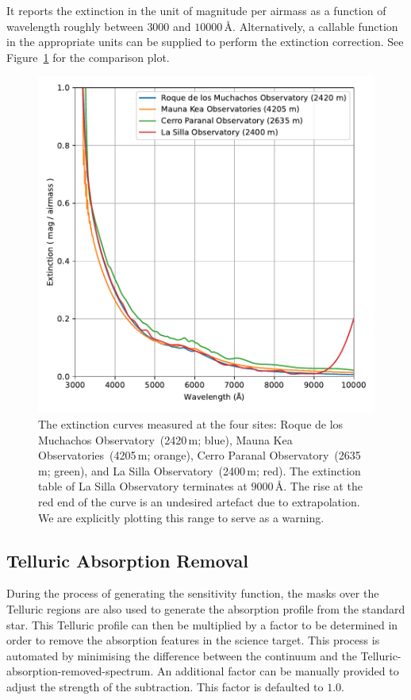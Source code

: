 \documentclass[fleqn,usenatbib]{mnras}
\begin{document}
It reports the extinction in the unit of magnitude per airmass as a
function of wavelength roughly between $3000$ and $10000$\,\AA.
Alternatively, a callable function in the appropriate units can be
supplied to perform the extinction correction. See Figure~\ref{fig:extinction}
for the comparison plot.

\begin{figure}
    \centering
    \includegraphics[width=\columnwidth]{fig_07_extinction_curves.pdf}
    \caption{The extinction curves measured at the four sites: Roque de los Muchachos
    Observatory~(2420\,m; blue), Mauna Kea Observatories~(4205\,m; orange),
    Cerro Paranal Observatory~(2635\,m; green), and La Silla Observatory~(2400\,m; red).
    The extinction table of La Silla Observatory terminates at $9000$\,\AA. The rise at
    the red end of the curve is an undesired artefact due to extrapolation. We are
    explicitly plotting this range to serve as a warning.}
    \label{fig:extinction}
\end{figure}

\subsection{Telluric Absorption Removal}
During the process of generating the sensitivity function, the masks
over the Telluric regions are also used to generate the absorption profile
from the standard star. This Telluric profile can then be multiplied
by a factor to be determined in order to remove the absorption features
in the science target. This process is automated by minimising the difference
between the continuum and the Telluric-absorption-removed-spectrum. An
additional factor can be manually provided to adjust the strength of the
subtraction. This factor is defaulted to $1.0$.
\end{document}
